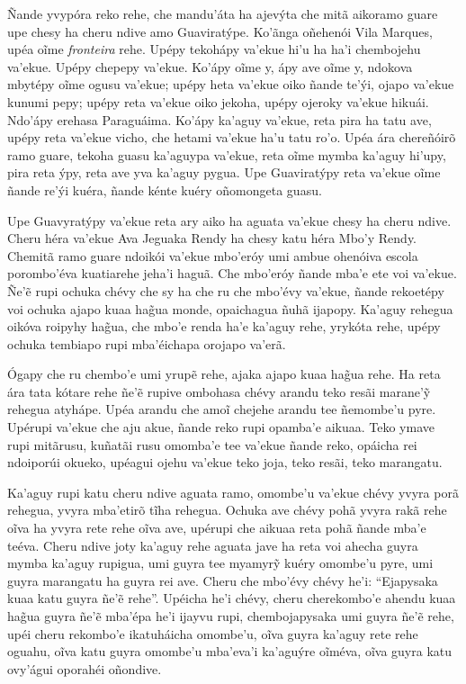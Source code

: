 \noindent{}Ñande yvypóra reko rehe, che mandu'áta ha ajevýta che mitã aikoramo
guare upe chesy ha cheru ndive amo Guaviratýpe. Ko'ãnga oñehenói Vila
Marques, upéa oĩme \textit{fronteira} rehe. Upépy tekohápy va'ekue hi'u ha
ha'i chembojehu va'ekue. Upépy chepepy va'ekue. Ko'ápy oĩme y, ápy ave
oĩme y, ndokova mbytépy oĩme ogusu va'ekue; upépy heta va'ekue oiko
ñande te'ýi, ojapo va'ekue kunumi pepy; upépy reta va'ekue oiko jekoha,
upépy ojeroky va'ekue hikuái. Ndo'ápy erehasa Paraguáima. Ko'ápy ka'aguy
va'ekue, reta pira ha tatu ave, upépy reta va'ekue vicho, che hetami
va'ekue ha'u tatu ro'o. Upéa ára chereñóirõ ramo guare, tekoha guasu
ka'aguypa va'ekue, reta oĩme mymba ka'aguy hi'upy, pira reta ýpy, reta
ave yva ka'aguy pygua. Upe Guaviratýpy reta va'ekue oĩme ñande re'ýi
kuéra, ñande kénte kuéry oñomongeta guasu.

Upe Guavyratýpy va'ekue reta ary aiko ha aguata va'ekue chesy ha cheru
ndive. Cheru héra va'ekue Ava Jeguaka Rendy ha chesy katu héra Mbo'y
Rendy. Chemitã ramo guare ndoikói va'ekue mbo'eróy umi ambue ohenóiva
escola porombo'éva kuatiarehe jeha'i haguã. Che mbo'eróy ñande mba'e ete
voi va'ekue. Ñe'ẽ rupi ochuka chévy che sy ha che ru che mbo'évy
va'ekue, ñande rekoetépy voi ochuka ajapo kuaa hag̃ua monde, opaichagua
ñuhã ijapopy. Ka'aguy rehegua oikóva roipyhy hag̃ua, che mbo'e renda ha'e
ka'aguy rehe, yrykóta rehe, upépy ochuka tembiapo rupi mba'éichapa
orojapo va'erã.

Ógapy che ru chembo'e umi yrupẽ rehe, ajaka ajapo kuaa hag̃ua rehe. Ha
reta ára tata kótare rehe ñe'ẽ rupive ombohasa chévy arandu teko resãi
marane'ỹ rehegua atyhápe. Upéa arandu che amoĩ chejehe arandu tee
ñemombe'u pyre. Upérupi va'ekue che aju akue, ñande reko rupi opamba'e
aikuaa. Teko ymave rupi mitãrusu, kuñatãi rusu omomba'e tee va'ekue
ñande reko, opáicha rei ndoiporúi okueko, upéagui ojehu va'ekue teko
joja, teko resãi, teko marangatu.

Ka'aguy rupi katu cheru ndive aguata ramo, omombe'u va'ekue chévy yvyra
porã rehegua, yvyra mba'etirõ tĩha rehegua. Ochuka ave chévy pohã yvyra
rakã rehe oĩva ha yvyra rete rehe oĩva ave, upérupi che aikuaa reta pohã
ñande mba'e teéva. Cheru ndive joty ka'aguy rehe aguata jave ha reta voi
ahecha guyra mymba ka'aguy rupigua, umi guyra tee myamyrỹ kuéry omombe'u
pyre, umi guyra marangatu ha guyra rei ave. Cheru che mbo'évy chévy
he'i: ``Ejapysaka kuaa katu guyra ñe'ẽ rehe''. Upéicha he'i chévy, cheru
cherekombo'e ahendu kuaa hag̃ua guyra ñe'ẽ mba'épa he'i ijayvu rupi,
chembojapysaka umi guyra ñe'ẽ rehe, upéi cheru rekombo'e ikatuháicha
omombe'u, oĩva guyra ka'aguy rete rehe oguahu, oĩva katu guyra omombe'u
mba'eva'i ka'aguýre oĩméva, oĩva guyra katu ovy'águi oporahéi oñondive.

